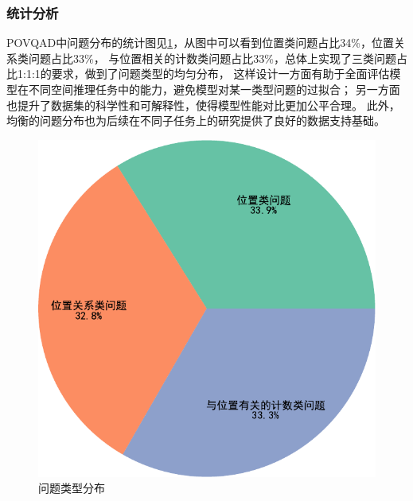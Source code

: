 \subsubsection{统计分析}
POVQAD中问题分布的统计图见\ref{fig:question_statistics}，从图中可以看到位置类问题占比34\%，位置关系类问题占比33\%，
与位置相关的计数类问题占比33\%，总体上实现了三类问题占比1:1:1的要求，做到了问题类型的均匀分布，
这样设计一方面有助于全面评估模型在不同空间推理任务中的能力，避免模型对某一类型问题的过拟合；
另一方面也提升了数据集的科学性和可解释性，使得模型性能对比更加公平合理。
此外，均衡的问题分布也为后续在不同子任务上的研究提供了良好的数据支持基础。
\begin{figure}[h]
    \centering
    \includegraphics[scale=0.6]{figures/三种类型问题占比-crop.pdf}
    \caption{问题类型分布}
    \label{fig:question_statistics}
\end{figure}
